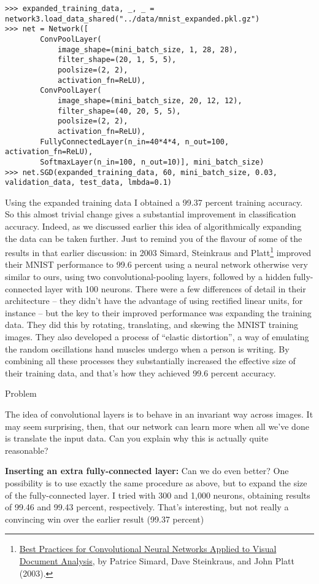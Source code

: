 \documentclass[a4paper,twoside,10pt]{book}
\begin{document}
\begin{lstlisting}
>>> expanded_training_data, _, _ = network3.load_data_shared("../data/mnist_expanded.pkl.gz")
>>> net = Network([
		ConvPoolLayer(
			image_shape=(mini_batch_size, 1, 28, 28),
			filter_shape=(20, 1, 5, 5), 
			poolsize=(2, 2), 
			activation_fn=ReLU),
		ConvPoolLayer(
			image_shape=(mini_batch_size, 20, 12, 12),
			filter_shape=(40, 20, 5, 5), 
			poolsize=(2, 2),
			activation_fn=ReLU),
		FullyConnectedLayer(n_in=40*4*4, n_out=100, activation_fn=ReLU),
		SoftmaxLayer(n_in=100, n_out=10)], mini_batch_size)
>>> net.SGD(expanded_training_data, 60, mini_batch_size, 0.03, validation_data, test_data, lmbda=0.1)
\end{lstlisting}
Using the expanded training data I obtained a 99.37 percent training accuracy. So this almost trivial change gives a substantial improvement in classification accuracy. Indeed, as we discussed earlier this idea of algorithmically expanding the data can be taken further. Just to remind you of the flavour of some of the results in that earlier discussion: in 2003 Simard, Steinkraus and Platt\footnote{\href{http://dx.doi.org/10.1109/ICDAR.2003.1227801}{Best Practices for Convolutional Neural Networks Applied to Visual Document Analysis}, by Patrice Simard, Dave Steinkraus, and John Platt (2003).} improved their MNIST performance to 99.6 percent using a neural network otherwise very similar to ours, using two convolutional-pooling layers, followed by a hidden fully-connected layer with 100 neurons. There were a few differences of detail in their architecture -- they didn't have the advantage of using rectified linear units, for instance -- but the key to their improved performance was expanding the training data. They did this by rotating, translating, and skewing the MNIST training images. They also developed a process of ``elastic distortion'', a way of emulating the random oscillations hand muscles undergo when a person is writing. By combining all these processes they substantially increased the effective size of their training data, and that's how they achieved 99.6 percent accuracy.

\begin{exercize}{Problem}
\item The idea of convolutional layers is to behave in an invariant way across images. It may seem surprising, then, that our network can learn more when all we've done is translate the input data. Can you explain why this is actually quite reasonable?
\end{exercize}
\textbf{Inserting an extra fully-connected layer:} Can we do even better? One possibility is to use exactly the same procedure as above, but to expand the size of the fully-connected layer. I tried with 300 and 1,000 neurons, obtaining results of 99.46 and 99.43 percent, respectively. That's interesting, but not really a convincing win over the earlier result (99.37 percent)
\end{document}
